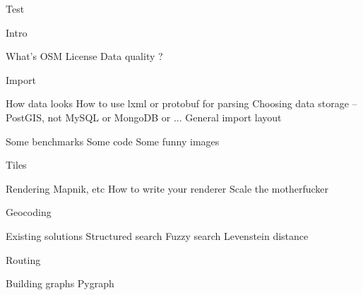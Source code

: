 \documentclass{beamer}
\begin{document}
\begin{frame}{Test}
  \begin{center}
    
  \end{center}
\end{frame}

Intro

What's OSM
License
Data quality ?

Import

How data looks
How to use lxml or protobuf for parsing
Choosing data storage -- PostGIS, not MySQL or MongoDB or ...
General import layout

Some benchmarks
Some code
Some funny images

Tiles

Rendering
Mapnik, etc
How to write your renderer
Scale the motherfucker

Geocoding

Existing solutions
Structured search
Fuzzy search
Levenstein distance

Routing

Building graphs
Pygraph
\end{document}
